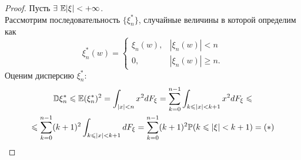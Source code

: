 \begin{proof}
    Пусть $\exists\  \mathbb{E}|\xi| < +\infty$. \\
    Рассмотрим последовательность $\{\xi_n^*\}$, случайные величины в которой определим как
    \[
        \xi_n^*(w) =
        \begin{cases}
            \xi_n(w), & |\xi_n(w)| < n \\
            0, & |\xi_n(w)| \geq n.
        \end{cases}
    \]
    Оценим дисперсию $\xi_n^*$:
    \begin{multline*}
        \mathbb{D} \xi_n^* \leqslant \mathbb{E} (\xi_n^*)^2 = \int_{|x| < n} x^2dF_\xi = \sum\limits_{k = 0}^{n - 1}\int_{k \leqslant |x| < k + 1}x^2dF_\xi \leqslant \\ \leqslant \sum\limits_{k = 0}^{n - 1}(k + 1)^2 \int_{k \leqslant |x| < k + 1}dF_{\xi} = \sum\limits_{k = 0}^{n - 1}(k + 1)^2\mathbb{P}(k \leqslant |\xi| < k + 1) = (*)
    \end{multline*}


\end{proof}
